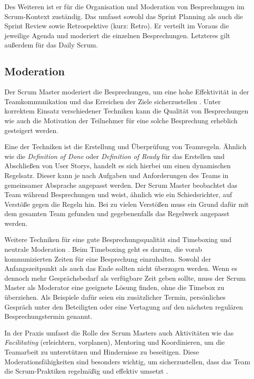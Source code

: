 \documentclass[5pt, final]{beamer}
\begin{document}
\begin{frame}[t]
\begin{multicols}{3}
			Des Weiteren ist er für die Organisation und Moderation von Besprechungen im Scrum-Kontext zuständig.
			Das umfasst sowohl das Sprint Planning als auch die Sprint Review sowie Retrospektive (kurz: Retro).
			Er verteilt im Voraus die jeweilige Agenda und moderiert die einzelnen Besprechungen.
			Letzteres gilt außerdem für das Daily Scrum.
			
			\subsection{Moderation}
			
			Der Scrum Master moderiert die Besprechungen, um eine hohe Effektivität in der Teamkommunikation und das Erreichen der Ziele sicherzustellen \cite{vantighem24}.
			Unter korrektem Einsatz verschiedener Techniken kann die Qualität von Besprechungen wie auch die Motivation der Teilnehmer für eine solche Besprechung erheblich gesteigert werden.
			
			Eine der Techniken ist die Erstellung und Überprüfung von Teamregeln.
			Ähnlich wie die \textit{Definition of Done} oder \textit{Definition of Ready} für das Erstellen und Abschließen von User Storys, handelt es sich hierbei um einen dynamischen Regelsatz.
			Dieser kann je nach Aufgaben und Anforderungen des Teams in gemeinsamer Absprache angepasst werden.
			Der Scrum Master beobachtet das Team während Besprechungen und weist, ähnlich wie ein Schiedsrichter, auf Verstöße gegen die Regeln hin.
			Bei zu vielen Verstößen muss ein Grund dafür mit dem gesamten Team gefunden und gegebenenfalls das Regelwerk angepasst werden.
			
            Weitere Techniken für eine gute Besprechungsqualität sind Timeboxing und neutrale Moderation \cite[S. 23ff.]{malten24}.
            Beim Timeboxing geht es darum, die vorab kommunizierten Zeiten für eine Besprechung einzuhalten.
            Sowohl der Anfangszeitpunkt als auch das Ende sollten nicht überzogen werden.
            Wenn es dennoch mehr Gesprächsbedarf als verfügbare Zeit geben sollte, muss der Scrum Master als Moderator eine geeignete Lösung finden, ohne die Timebox zu überziehen.
            Als Beispiele dafür seien ein zusätzlicher Termin, persönliches Gespräch unter den Beteiligten oder eine Vertagung auf den nächsten regulären Besprechungstermin genannt.
            
			In der Praxis umfasst die Rolle des Scrum Masters auch Aktivitäten wie das \textit{Facilitating} (erleichtern, vorplanen), Mentoring und Koordinieren, um die Teamarbeit zu unterstützen und Hindernisse zu beseitigen.
            Diese Moderationsfähigkeiten sind besonders wichtig, um sicherzustellen, dass das Team die Scrum-Praktiken regelmäßig und effektiv umsetzt \cite{Shastri21}.
			

\end{multicols}
\end{frame}
\end{document}
